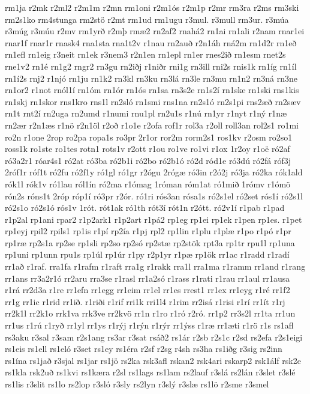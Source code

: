 {rm1ja
r2mk
r2ml2
r2m1m
r2mn
rm1oni
r2m1ós
r2m1p
r2mr
rm3ra
r2ms
rm3ski
rm2s1ko
rm4stunga
rm2stö
r2mt
rm1ud
rm1ugu
r3mul.
r3mull
rm3ur.
r3múa
r3múg
r3múu
r2mv
rm1yrð
r2mþ
rmæ2
rn2af2
rnahá2
rn1ai
rn1ali
r2nam
rnar1ei
rnar1f
rnar1r
rnask4
rna1sta
rna1t2v
r1nau
rn2auð
r2n1áh
rná2m
rn1d2r
rn1eð
rn1efl
rn1eig
r3neit
rn1ek
r3nem3
r2n1en
rn1epl
rn1er
rnes2ið
rn1esm
rnet2s
rne1v2
rn1é
rn1g2
rngr2
rn3gu
rn2iðj
r1niðr
rni1g
rn3ill
rni2s
rnis1k
rn1íg
rn1íl
rn1í2s
rnj2
r1njó
rn1ju
rn1k2
rn3kl
rn3ku
rn3lá
rn3le
rn3mu
rn1n2
rn3ná
rn3ne
rn1or2
r1not
rnól1í
rn1óm
rn1ór
rn1ós
rn1sa
rn3s2e
rn1s2í
rn1ske
rn1ski
rns1kis
rn1skj
rn1skor
rns1kro
rns1l
rn2sló
rn1smi
rns1na
rn2s1ó
rn2s1pi
rns2æð
rn2sæv
rn1t
rnt2í
rn2uga
rn2umd
r1numi
rnu1pl
rn2u1s
r1nú
rn1yr
r1nyt
r1ný
r1næ
rn2ær
r2n1æs
r1nö
r2n1öl
r2oð
r1o1e
r2ofa
rof1r
rol3a
r2oll
roll3an
rol2s1
ro1mi
ro2n
r1one
2rop
ro2pa
ropa1s
ro3pr
2r1or
ror2m
rorm2s1
ros1kv
r2osm
ro2so1
ross1k
ro1ste
ro1tes
rotn1
rots1v
r2ott
r1ou
ro1ve
ro1vi
r1ox
1r2oy
r1oë
ró2af
ró3a2r1
róar4s1
ró2at
ró3ba
ró2b1i
ró2bo
ró2b1ó
ró2d
ród1e
ró3dú
ró2fá
róf3j
2róf1r
róf1t
ró2fu
ró2f1y
ró1gl
ró1gr
r2ógu
2rógæ
ró3in
r2ó2j
ró3ja
ró2ka
rók1ald
rók1l
rók1v
ró1lau
ról1ín
ró2ma
r1ómag
1róman
róm1at
ró1mið
1rómv
r1ómö
rón2s
róns1t
2róp
róp1í
ró3pr
r2ór.
ró1ri
rós3an
rósa1s
ró2s1el
ró2set
rós1í
ró2s1l
ró2s1o
ró2s1ó
rós1v
1rót.
rót1ak
ró1th
rót3í
rót1n
r2ótt.
ró2v1í
r1pab
r1pad
r1p2al
rp1ani
rpar2
r1p2ark1
r1p2art
r1pá2
rp1eg
rp1ei
rp1ek
r1pen
rp1es.
r1pet
rp1eyj
rpil2
rpils1
rp1is
r1pí
rp2ía
r1pj
rpl2
rp1lin
r1plu
r1plæ
r1po
r1pó
r1pr
rp1ræ
rp2s1a
rp2se
rp1sli
rp2so
rp2só
rp2stæ
rp2stök
rpt3a
rp1tr
rpu1l
rp1una
rp1uni
rp1unn
rpu1s
rp1úl
rp1úr
r1py
r2p1yr
r1pæ
rp1ök
rr1ac
r1radd
r1radí
rr1að
r1raf.
rra1fa
r1rafm
r1raft
rra1g
r1rakk
rra1l
rra1ma
r1ramm
rr1and
r1rang
rr1ans
rr3a2r1ó
rr2aru
rra3se
r1rasl
rr1a2só
r1rass
r1rati
r1rau
rr1aul
rr1ausa
r1rá
rr2d3a
r1re
rr1efn
rr1egg
rr1eim
rr1el
rr1es
rrest1
rr1ex
rr1eyg
r1ré
rr1f2
rr1g
rr1ic
r1rid
rr1ið.
r1riði
r1rif
rri1k
rri1l4
r1rim
rr2isá
r1risi
r1rí
rr1ít
r1rj
rr2k1l
rr2k1o
rrk1va
rrk3ve
rr2kvö
rr1n
r1ro
r1ró
r2ró.
rr1p2
rr3s2l
rr1ta
rr1un
rr1us
r1rú
r1ryð
rr1yl
rr1ys
r1rýj
r1rýn
r1rýr
rr1ýss
r1ræ
rr1æti
r1rö
r1s
rs1afl
rs3aku
r3sal
r3sam
r2s1ang
rs3ar
r3sat
rsáð2
rs1ár
r2sb
r2s1c
r2sd
rs2efa
r2s1eigi
rs1eis
rs1ell
rs1eló
r3set
rs1ey
rs1éra
r2sf
r2sg
r4sh
rs3ha
rs1iðg
r3sig
rs2inn
rs1ína
rs1jað
r3sjal
rs1jar
rs1jö
rs2ka
rsk3afl
rskan2
rsk4ari
rskarp2
rsk1álf
rsk2e
rs1kla
rsk2uð
rs1kvi
rs1kæra
r2sl
rs1lags
rs1lam
rs2lauf
r3slá
rs2lán
r3slet
r3slé
rs1lis
r3slit
rs1lo
rs2lop
r3sló
r3sly
rs2lyn
r3slý
r3slæ
rs1lö
r2sme
r3smel
}
